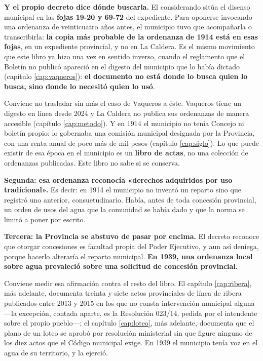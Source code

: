 \textbf{Y el propio decreto dice dónde buscarla.} El considerando sitúa el disenso municipal
en las \textbf{fojas 19-20 y 69-72} del expediente. Para oponerse invocando una ordenanza de
veinticuatro años antes, el municipio tuvo que acompañarla o transcribirla: \textbf{la copia
más probable de la ordenanza de 1914 está en esas fojas}, en un expediente provincial, y no en
La Caldera. Es el mismo movimiento que este libro ya hizo una vez en sentido inverso, cuando el
reglamento que el Boletín no publicó apareció en el digesto del municipio que lo había dictado
(capítulo \ref{cap:vaqueros}): \textbf{el documento no está donde lo busca quien lo busca,
sino donde lo necesitó quien lo usó}.

\begin{cautela}
Conviene no trasladar sin más el caso de Vaqueros a éste. Vaqueros tiene un digesto en línea
desde 2024 y La Caldera no publica sus ordenanzas de manera accesible (capítulo
\ref{cap:metodo}). Y en 1914 el municipio no tenía Concejo ni boletín propio: lo gobernaba una
comisión municipal designada por la Provincia, con una renta anual de poco más de mil pesos
(capítulo \ref{cap:siglo}). Lo que puede existir de esa época en el municipio es un
\textbf{libro de actas}, no una colección de ordenanzas publicadas. Este libro no sabe si se
conserva.
\end{cautela}

\textbf{Segunda: esa ordenanza reconocía «derechos adquiridos por uso tradicional».} Es decir:
en 1914 el municipio no inventó un reparto sino que registró uno anterior, consuetudinario.
Había, antes de toda concesión provincial, un orden de usos del agua que la comunidad se había
dado y que la norma se limitó a poner por escrito.

\textbf{Tercera: la Provincia se abstuvo de pasar por encima.} El decreto reconoce que otorgar
concesiones es facultad propia del Poder Ejecutivo, y aun así deniega, porque hacerlo
alteraría el reparto municipal. \textbf{En 1939, una ordenanza local sobre agua prevaleció
sobre una solicitud de concesión provincial.}

Conviene medir esa afirmación contra el resto del libro. El capítulo \ref{cap:ribera}, más adelante, documenta treinta y siete
actos provinciales de línea de ribera publicados entre 2013 y 2015 en los que no consta intervención municipal alguna ---la excepción, contada aparte, es la Resolución 023/14, pedida por el intendente sobre el propio pueblo---; el capítulo \ref{cap:loteo}, más adelante, documenta que el plano de un loteo se aprobó por resolución
ministerial sin que figure ninguno de los diez actos que el Código municipal exige. En
1939 el municipio tenía voz en el agua de su territorio, y la ejerció.

